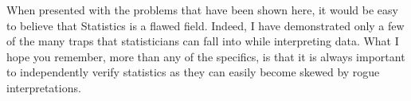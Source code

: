 When presented with the problems that have been shown here, it would be easy to believe that Statistics is a flawed field. Indeed, I have demonstrated only a few of the many traps that statisticians can fall into while interpreting data. What I hope you remember, more than any of the specifics, is that it is always important to independently verify statistics as they can easily become skewed by rogue interpretations.
